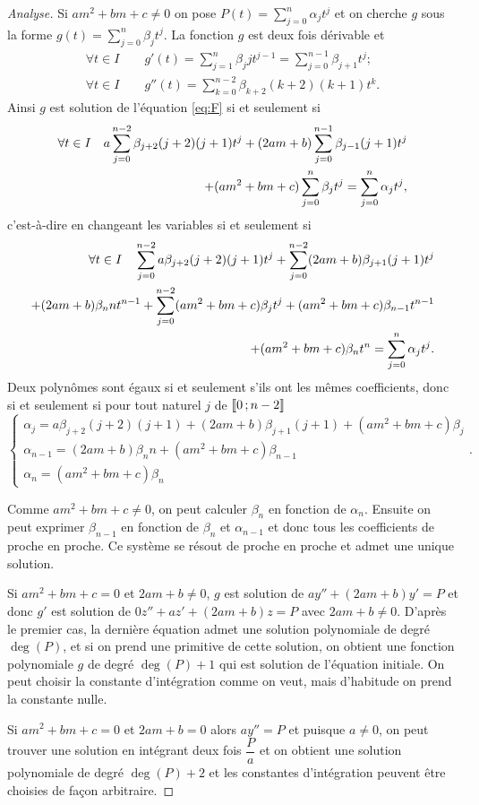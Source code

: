 \begin{proof}[Analyse]
Si $am^2+bm+c \neq 0$ on pose $P(t)=\sum_{j=0}^{n} \alpha_j t^j$ et on cherche $g$ sous la forme $g(t)=\sum_{j=0}^{n} \beta_j t^j$. La fonction $g$ est deux fois dérivable et 
\begin{gather}
\forall t \in I \qquad g'(t)=\sum_{j=1}^n \beta_j j t^{j-1}=\sum_{j=0}^{n-1} \beta_{j+1} t^j; \\
\forall t \in I \qquad g''(t)=\sum_{k=0}^{n-2} \beta_{k+2} (k+2)(k+1) t^k.
\end{gather}
 Ainsi $g$ est solution de l'équation \eqref{eq:F} si et seulement si 
  \begin{align}
    \forall t \in I \quad  a \sum_{j=0}^{n-2} \beta_{j+2} (j+2)(j+1)t^j+ (2am+b) \sum_{j=0}^{n-1} \beta_{j-1}(j+1)t^j \notag \\
      + (am^2+bm+c)\sum_{j=0}^{n} \beta_j t^j  =  \sum_{j=0}^{n} \alpha_j t^j,
\end{align}
c'est-à-dire en changeant les variables si et seulement si
\begin{align}
    \forall t \in I \quad \sum_{j=0}^{n-2} a\beta_{j+2} (j+2)(j+1)t^j +  \sum_{j=0}^{n-2}(2am+b)\beta_{j+1}(j+1)t^j  \notag \\ 
    + (2am+b)\beta_n nt^{n-1}+ \sum_{j=0}^{n-2} (am^2+bm+c) \beta_j t^j  + (am^2+bm+c)\beta_{n-1} t^{n-1} \notag \\ 
    + (am^2+bm+c) \beta_nt^n=\sum_{j=0}^{n} \alpha_j t^j.
  \end{align}
Deux polynômes sont égaux si et seulement s'ils ont les mêmes coefficients, donc si et seulement si pour tout naturel $j$ de $\mathopen{\llbracket}0\mathclose{}\mathpunct{};n-2\mathclose{\rrbracket}$
\begin{equation}
  \begin{cases}
    \alpha_j= a \beta_{j+2}(j+2)(j+1)+(2am+b)\beta_{j+1}(j+1)+(am^2+bm+c)\beta_j\\ 
    \alpha_{n-1}= (2am+b)\beta_n n +(am^2+bm+c)\beta_{n-1} \\ 
    \alpha_n=(am^2+bm+c) \beta_n
  \end{cases}.
\end{equation}

Comme $am^2+bm+c \neq 0$, on peut calculer $\beta_n$ en fonction de $\alpha_n$. Ensuite on peut exprimer $\beta_{n-1}$ en fonction de $\beta_{n}$ et $\alpha_{n-1}$ et donc tous les coefficients de proche en proche. Ce système se résout de proche en proche et admet une unique solution.

Si $am^2+bm+c=0$ et $2am+b \neq 0$, $g$ est solution de $ay''+(2am+b)y'=P$ et donc $g'$ est solution de $0z''+az'+(2am+b)z=P$ avec $2am+b \neq 0$. D'après le premier cas, la dernière équation admet une solution polynomiale de degré $\deg(P)$, et si on prend une primitive de cette solution, on obtient une fonction polynomiale $g$ de degré $\deg(P) + 1$ qui est solution de l'équation initiale. On peut choisir la constante d'intégration comme on veut, mais d'habitude on prend la constante nulle.

Si $am^2+bm+c = 0$ et $2am+b = 0$ alors $ay''=P$ et puisque $a \neq 0$, on peut trouver une solution en intégrant deux fois $\dfrac{P}{a}$ et on obtient une solution polynomiale de degré $\deg(P)+2$ et les constantes d'intégration peuvent être choisies de façon arbitraire.
\end{proof}
